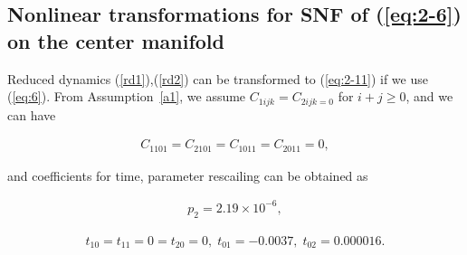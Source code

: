 \documentclass[openacc]{rsproca_new}%
\newcommand{\Eref}[1]{(\ref{#1})}
\newcommand{\asref}[1]{Assumption~\ref{#1}}
\begin{document}
\begin{appendices}
\section{Nonlinear transformations for SNF of  \Eref{eq:2-6} on the center manifold} \label{ap2}

Reduced dynamics \Eref{rd1},\Eref{rd2} can be transformed to \Eref{eq:2-11} if we use \Eref{eq:6}. From \asref{a1}, we assume $C_{1ijk}=C_{2ijk=0}$ for $i+j \geq 0$, and we can have

\begin{align}
C_{1101}=C_{2101}=C_{1011}=C_{2011}=0,
\end{align}

\noindent and coefficients for time, parameter rescailing can be obtained as

\begin{align}
p_2=2.19\times10^{-6},
\end{align}

\begin{align}
t_{10}=t_{11}=0=t_{20}=0,\;t_{01}=-0.0037, \; t_{02}=0.000016.
\end{align}

\end{appendices}






\end{document}
